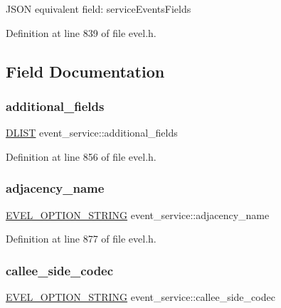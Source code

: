 J\+S\+ON equivalent field\+: service\+Events\+Fields 

Definition at line 839 of file evel.\+h.



\subsection{Field Documentation}
\hypertarget{structevent__service_aa95b69a459b3132bc86fc3961cf3cf99}{}\label{structevent__service_aa95b69a459b3132bc86fc3961cf3cf99} 
\subsubsection{\texorpdfstring{additional\+\_\+fields}{additional\_fields}}
{\footnotesize\ttfamily \hyperlink{double__list_8h_a45f4a129042d9e1aa4ffd31fe13e4d14}{D\+L\+I\+ST} event\+\_\+service\+::additional\+\_\+fields}



Definition at line 856 of file evel.\+h.

\hypertarget{structevent__service_a7a0d5763c2bf8ad8a180f54d4427fa7e}{}\label{structevent__service_a7a0d5763c2bf8ad8a180f54d4427fa7e} 
\subsubsection{\texorpdfstring{adjacency\+\_\+name}{adjacency\_name}}
{\footnotesize\ttfamily \hyperlink{evel_8h_a0de5113a7b72de93c0c7b644f7ea7ec3}{E\+V\+E\+L\+\_\+\+O\+P\+T\+I\+O\+N\+\_\+\+S\+T\+R\+I\+NG} event\+\_\+service\+::adjacency\+\_\+name}



Definition at line 877 of file evel.\+h.

\hypertarget{structevent__service_a1ce1a5cbe06b287f416da7f9516c89f9}{}\label{structevent__service_a1ce1a5cbe06b287f416da7f9516c89f9} 
\subsubsection{\texorpdfstring{callee\+\_\+side\+\_\+codec}{callee\_side\_codec}}
{\footnotesize\ttfamily \hyperlink{evel_8h_a0de5113a7b72de93c0c7b644f7ea7ec3}{E\+V\+E\+L\+\_\+\+O\+P\+T\+I\+O\+N\+\_\+\+S\+T\+R\+I\+NG} event\+\_\+service\+::callee\+\_\+side\+\_\+codec}



